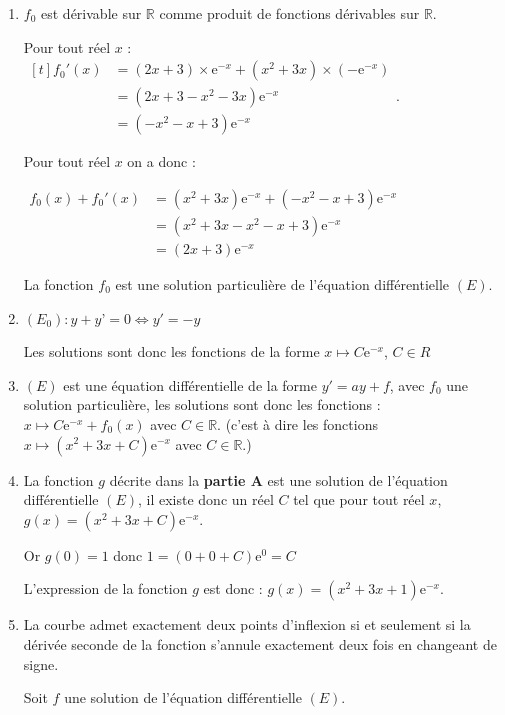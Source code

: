 \documentclass[10pt]{article}
\providecommand{\R}{\mathbb{R}}
\providecommand{\e}{{\mathrm{e}}}
\begin{document}
\begin{enumerate}
\item $f_{0}$ est dérivable sur $\R$ comme produit de fonctions dérivables sur $\R$. 

Pour tout réel $x$ :\quad 
$\begin{aligned}[t] f_0'(x) & = \left(2x+3\right) \times \e^{-x}+ \left(x^2+3x\right)\times (-\e^{-x})\\
	& = \left(2x+3-x^2-3x\right)\e^{-x}\\
	& =\left(-x^2-x+3\right)\e^{-x}
\end{aligned}$.

Pour tout réel $x$ on a donc :

$\begin{aligned} f_0(x)+f_0'(x)& = \left(x^{2}+3 x\right) \e^{-x}+\left(-x^2-x+3\right)\e^{-x}\\
	& = \left(x^{2}+3 x-x^2-x+3\right)\e^{-x}\\
	&=\left(2 x+3\right)\e^{-x}
\end{aligned}$ 

La fonction $f_{0}$  est une solution particulière de l'équation différentielle $(E)$.

	\item  $\left(E_{0}\right): y+y’=0 \iff y'=-y$ 

Les solutions sont donc les fonctions de la forme $x \longmapsto C\e^{-x}$, $C\in R$

	\item $(E)$ est une équation différentielle de la forme $y'=ay+f$, avec $f_0$ une solution particulière, les solutions sont donc les fonctions : \quad $x\longmapsto C\e^{-x } + f_0(x)$ avec $C\in\R$. (c'est à dire les fonctions $x\longmapsto  \left(x^{2}+3 x+C\right) \e^{-x} $  avec $C\in\R$.)
	\item La fonction $g$ décrite dans la \textbf{partie A} est une solution de l'équation différentielle $(E)$, il existe donc un réel $C$ tel que 
pour tout réel $x$, $g(x)= \left(x^{2}+3 x+C\right) \e^{-x} $. 

Or $g(0)=1$ donc $1=(0+0+C)\e^0=C$

L'expression de la fonction $g$ est donc : $g(x)= \left(x^{2}+3 x+1\right) \e^{-x} $. 
	\item La courbe admet exactement deux points d'inflexion si et seulement si la dérivée seconde de la fonction s'annule exactement deux fois en changeant de signe. 

Soit $f$ une solution de l'équation différentielle $(E)$. 


\end{enumerate}
\end{document}
